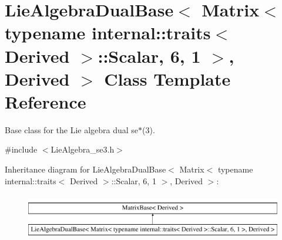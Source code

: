 \hypertarget{class_lie_algebra_dual_base_3_01_matrix_3_01typename_01internal_1_1traits_3_01_derived_01_4_1_1_7557dc73cbfcbc32e399b9855a977d47}{}\section{Lie\+Algebra\+Dual\+Base$<$ Matrix$<$ typename internal\+:\+:traits$<$ Derived $>$\+:\+:Scalar, 6, 1 $>$, Derived $>$ Class Template Reference}
\label{class_lie_algebra_dual_base_3_01_matrix_3_01typename_01internal_1_1traits_3_01_derived_01_4_1_1_7557dc73cbfcbc32e399b9855a977d47}


Base class for the Lie algebra dual se$\ast$(3).  




{\ttfamily \#include $<$Lie\+Algebra\+\_\+se3.\+h$>$}

Inheritance diagram for Lie\+Algebra\+Dual\+Base$<$ Matrix$<$ typename internal\+:\+:traits$<$ Derived $>$\+:\+:Scalar, 6, 1 $>$, Derived $>$\+:\begin{figure}[H]
\begin{center}
\leavevmode
\includegraphics[height=2.000000cm]{class_lie_algebra_dual_base_3_01_matrix_3_01typename_01internal_1_1traits_3_01_derived_01_4_1_1_7557dc73cbfcbc32e399b9855a977d47}
\end{center}
\end{figure}
